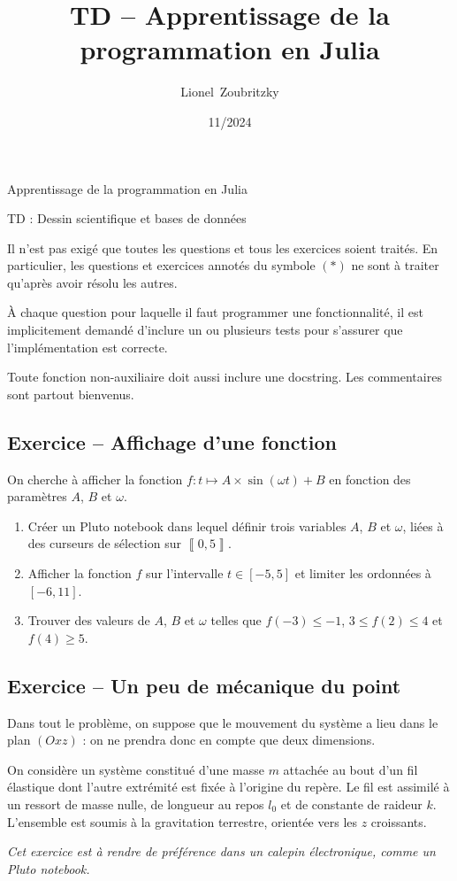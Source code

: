 \documentclass{article}
\title{TD -- Apprentissage de la programmation en Julia}
\author{Lionel~Zoubritzky}
\date{11/2024}
\newcounter{loop}
\newcounter{numEx}
\newcommand{\exo}[1]{
	\stepcounter{numEx}
	\setcounter{loop}{0}
	\subsection*{Exercice \arabic{numEx} -- #1}
}
\newcommand{\llbra}{\left\llbracket}
\newcommand{\rrbra}{\right\rrbracket}
\renewcommand{\brack}[1]{\ensuremath{\llbra#1\rrbra}}
\begin{document}
	
\begin{center}
	\Large Apprentissage de la programmation en Julia
	
	TD  : Dessin scientifique et bases de données
	\vspace{2em}
\end{center}

Il n'est pas exigé que toutes les questions et tous les exercices soient traités. En particulier, les questions et exercices annotés du symbole $(*)$ ne sont à traiter qu'après avoir résolu les autres.

À chaque question pour laquelle il faut programmer une fonctionnalité, il est implicitement demandé d'inclure un ou plusieurs tests pour s'assurer que l'implémentation est correcte.

Toute fonction non-auxiliaire doit aussi inclure une docstring. Les commentaires sont partout bienvenus.

\exo{Affichage d'une fonction}

On cherche à afficher la fonction $f:t\mapsto A\times\sin(\omega t) + B$ en fonction des paramètres $A$, $B$ et $\omega$.

\begin{enumerate}
	\item Créer un Pluto notebook dans lequel définir trois variables $A$, $B$ et $\omega$, liées à des curseurs de sélection sur $\brack{0, 5}$.
	\item Afficher la fonction $f$ sur l'intervalle $t\in\left[-5, 5\right]$ et limiter les ordonnées à $\left[-6, 11\right]$.
	\item Trouver des valeurs de $A$, $B$ et $\omega$ telles que $f(-3) \le -1$, $3\le f(2) \le 4$ et $f(4) \ge 5$.
\end{enumerate}

\exo{Un peu de mécanique du point}

Dans tout le problème, on suppose que le mouvement du système a lieu dans le plan $(Oxz)$ : on ne prendra donc en compte que deux dimensions.

On considère un système constitué d'une masse $m$ attachée au bout d'un fil élastique dont l'autre extrémité est fixée à l'origine du repère. Le fil est assimilé à un ressort de masse nulle, de longueur au repos $l_0$ et de constante de raideur $k$. L'ensemble est soumis à la gravitation terrestre, orientée vers les $z$ croissants.

\textsl{Cet exercice est à rendre de préférence dans un calepin électronique, comme un Pluto notebook.}
\end{document}
